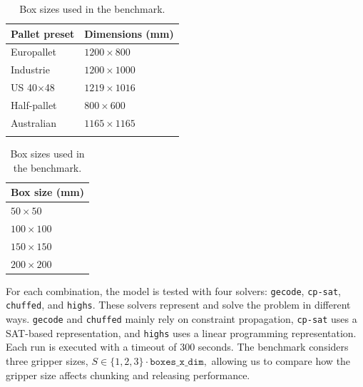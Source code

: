 \begin{table}[h]
  \centering

  \begin{minipage}[t]{0.49\linewidth}
    \centering
    \begin{tabularx}{\linewidth}{lX}
      \toprule
      \textbf{Pallet preset} & \textbf{Dimensions (mm)} \\
      \midrule
      Europallet      & $1200 \times 800$  \\
      Industrie       & $1200 \times 1000$ \\
      US 40$\times$48 & $1219 \times 1016$ \\
      Half-pallet     & $800  \times 600$  \\
      Australian      & $1165 \times 1165$ \\
      \addlinespace
      \bottomrule
    \end{tabularx}
    \caption{Pallet presets used in the benchmark.}
    \label{tab:bench-pallets}
  \end{minipage}
  \hfill
  \begin{minipage}[t]{0.49\linewidth}
    \centering
    \begin{tabularx}{0.8\linewidth}{X}
      \toprule\arraybackslash\textbf{Box size (mm)} \\
      \midrule
      \arraybackslash $50 \times 50$   \\
      \arraybackslash $100 \times 100$ \\
      \arraybackslash $150 \times 150$ \\
      \arraybackslash $200 \times 200$ \\
      \bottomrule
    \end{tabularx}
    \caption{Box sizes used in the benchmark.}
    \label{tab:bench-packs}
  \end{minipage}
\end{table}
For each combination, the model is tested with four solvers:
\texttt{gecode}, \texttt{cp-sat}, \texttt{chuffed}, and \texttt{highs}.
These solvers represent and solve the problem in different ways.
\texttt{gecode} and \texttt{chuffed} mainly rely on constraint propagation,
\texttt{cp-sat} uses a SAT-based representation, and
\texttt{highs} uses a linear programming representation. Each run is executed
with a timeout of 300 seconds.
The benchmark considers three gripper sizes, $S \in \{1,2,3\}\cdot \texttt{boxes\_x\_dim},$
allowing us to compare how the gripper size affects chunking and
releasing performance.

